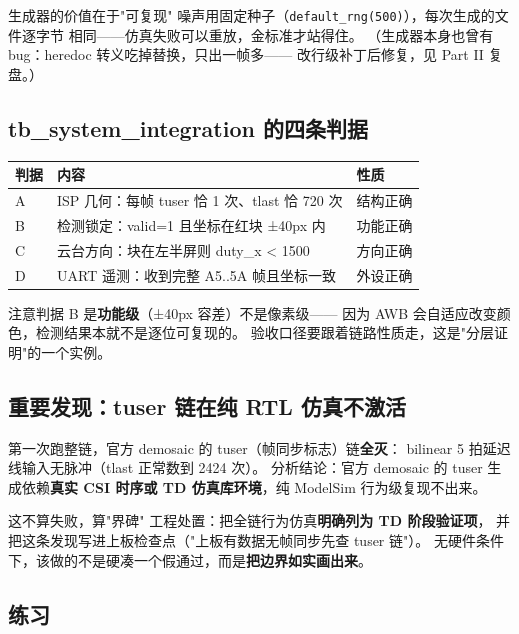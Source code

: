 \documentclass[11pt]{ctexart}
\newcommand{\code}[1]{\texttt{#1}}
\begin{document}
\begin{keybox}{生成器的价值在于"可复现"}
噪声用固定种子（\code{default\_rng(500)}），每次生成的文件逐字节
相同——仿真失败可以重放，金标准才站得住。
（生成器本身也曾有 bug：heredoc 转义吃掉替换，只出一帧多——
改行级补丁后修复，见 Part II 复盘。）
\end{keybox}

\subsection{tb\_system\_integration 的四条判据}

\begin{center}
\begin{tabular}{lll}
\toprule
\rowcolor{rowtint}\textbf{判据} & \textbf{内容} & \textbf{性质} \\
\midrule
A & ISP 几何：每帧 tuser 恰 1 次、tlast 恰 720 次 & 结构正确 \\
B & 检测锁定：valid=1 且坐标在红块 ±40px 内 & 功能正确 \\
C & 云台方向：块在左半屏则 duty\_x < 1500 & 方向正确 \\
D & UART 遥测：收到完整 A5..5A 帧且坐标一致 & 外设正确 \\
\bottomrule
\end{tabular}
\end{center}

注意判据 B 是\textbf{功能级}（±40px 容差）不是像素级——
因为 AWB 会自适应改变颜色，检测结果本就不是逐位可复现的。
验收口径要跟着链路性质走，这是"分层证明"的一个实例。

\subsection{重要发现：tuser 链在纯 RTL 仿真不激活}

第一次跑整链，官方 demosaic 的 tuser（帧同步标志）链\textbf{全灭}：
bilinear 5 拍延迟线输入无脉冲（tlast 正常数到 2424 次）。
分析结论：官方 demosaic 的 tuser 生成依赖\textbf{真实 CSI 时序或
TD 仿真库环境}，纯 ModelSim 行为级复现不出来。

\begin{warnbox}{这不算失败，算"界碑"}
工程处置：把全链行为仿真\textbf{明确列为 TD 阶段验证项}，
并把这条发现写进上板检查点（"上板有数据无帧同步先查 tuser 链"）。
无硬件条件下，该做的不是硬凑一个假通过，而是\textbf{把边界如实画出来}。
\end{warnbox}

\subsection{练习}
\end{document}
